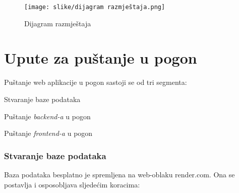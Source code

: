 		\begin{figure}[H]
			\texttt{[image: slike/dijagram razmještaja.png]}
			\centering
			\caption{Dijagram razmještaja}
			\label{fig:dijagram razmještaja}
		\end{figure}
			\eject 
		
		\section{Upute za puštanje u pogon}
		
			Puštanje web aplikacije u pogon sastoji se od tri segmenta:

			\begin{packed_item}
				\item Stvaranje baze podataka
				\item Puštanje \textit{backend-a} u pogon
				\item Puštanje \textit{frontend-a} u pogon
			\end{packed_item}

			\subsubsection{Stvaranje baze podataka}

			Baza podataka besplatno je spremljena na web-oblaku render.com. 
			Ona se postavlja i osposobljava sljedećim koracima:

